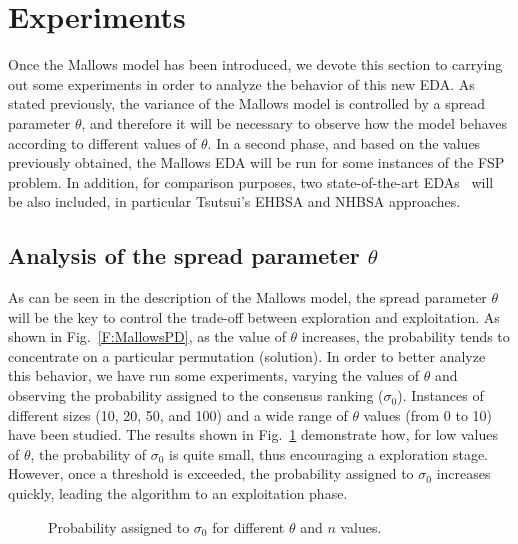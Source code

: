 \documentclass[runningheads]{llncs}
\begin{document}
\section{Experiments}

Once the Mallows model has been introduced, we devote this section to carrying out some experiments in order to analyze the behavior of this new EDA. As stated previously, the variance of the Mallows model is controlled by a spread parameter $\theta$, and therefore it will be necessary to observe how the model behaves according to different values of $\theta$. In a second phase, and based on the values previously obtained, the Mallows EDA will be run for some instances of the FSP problem. In addition, for comparison purposes, two state-of-the-art EDAs~\cite{ceberio11b} will be also included, in particular Tsutsui's EHBSA and NHBSA approaches.

\subsection{Analysis of the spread parameter $\theta$}

As can be seen in the description of the Mallows model, the spread parameter $\theta$ will be the key to control the trade-off between exploration and exploitation. As shown in Fig.~\ref{F:MallowsPD}, as the value of $\theta$ increases, the probability tends to concentrate on a particular permutation (solution). In order to better analyze this behavior, we have run some experiments, varying the values of $\theta$ and observing the probability assigned to the consensus ranking ($\sigma_0$). Instances of different sizes (10, 20, 50, and 100) and a wide range of $\theta$ values (from 0 to 10) have been studied. The results shown in Fig.~\ref{F:ProbabilityConsensuRanking} demonstrate how, for low values of $\theta$, the probability of $\sigma_0$ is quite small, thus encouraging a exploration stage. However, once a threshold is exceeded, the probability assigned to $\sigma_0$ increases quickly, leading the algorithm to an exploitation phase.

\begin{figure}
\centering
{}
\caption{Probability assigned to $\sigma_0$ for different $\theta$ and $n$ values.}
\label{F:ProbabilityConsensuRanking}
\end{figure}
\end{document}

